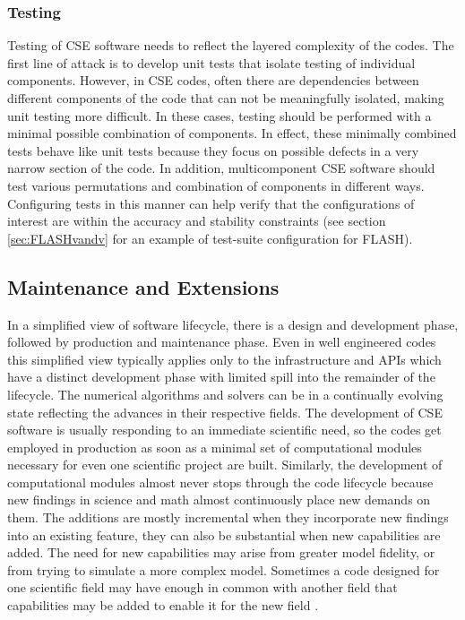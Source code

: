 \subsubsection{Testing}
\label{sec:testing}
Testing of CSE software needs to reflect the layered complexity of
the codes. The first line of attack is to develop 
unit tests that isolate testing of individual components. However, in
CSE codes, often there are dependencies between 
different components of the code that can not be meaningfully
isolated, making unit testing more difficult. In these cases, testing
should be performed with a minimal possible combination of components.  In
effect, these minimally combined tests behave like unit tests because they focus on possible
defects in a very narrow section of the code. In addition,
multicomponent CSE software should test various  permutations and
combination of components in different ways. Configuring tests in this
manner can help verify that the configurations of interest are within the
accuracy and stability constraints (see section
\ref{sec:FLASHvandv} for an example of test-suite configuration for FLASH).   

\subsection{Maintenance and Extensions}
\label{sec:maintain}
In a simplified view of software lifecycle, there is a design and development phase,
followed by production and maintenance phase.  Even in well engineered
codes this simplified view typically applies only to the
infrastructure and APIs which have a distinct development phase with
limited spill into the remainder of the lifecycle. The numerical 
algorithms and solvers can be in a continually evolving state
reflecting the advances in their respective fields.  
The development of CSE software is usually responding to an immediate
scientific need, so the codes get employed in production as soon as a
minimal set of computational modules necessary for even one scientific
project are built.  Similarly, the development of computational
modules almost never stops through the code lifecycle because new
findings in science and math almost continuously place new demands on
them. The additions are mostly incremental when they incorporate new
findings into an existing feature, they can also be substantial when
new capabilities are added. The need for new capabilities may arise
from  greater model fidelity, or from trying to simulate a more
complex model. Sometimes a code designed for one scientific field may
have enough in common with another field that capabilities may be
added to enable it for the new field \cite{Dubey2016Pasc}.    

